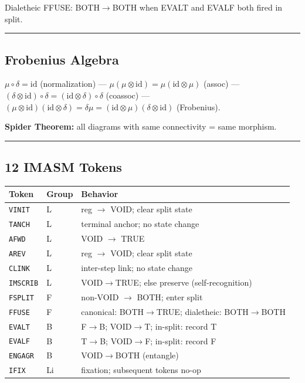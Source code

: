 Dialetheic FFUSE: BOTH\(\to\)BOTH when EVALT and EVALF both fired in
split.

\begin{center}\rule{0.5\linewidth}{0.5pt}\end{center}

\hypertarget{frobenius-algebra}{%
\subsection{Frobenius Algebra}\label{frobenius-algebra}}

\(\mu \circ \delta = \mathrm{id}\) (normalization) ---
\(\mu(\mu\otimes\mathrm{id}) = \mu(\mathrm{id}\otimes\mu)\) (assoc) ---
\((\delta\otimes\mathrm{id})\circ\delta = (\mathrm{id}\otimes\delta)\circ\delta\)
(coassoc) ---
\((\mu\otimes\mathrm{id})(\mathrm{id}\otimes\delta) = \delta\mu = (\mathrm{id}\otimes\mu)(\delta\otimes\mathrm{id})\)
(Frobenius).

\textbf{Spider Theorem:} all diagrams with same connectivity = same
morphism.

\begin{center}\rule{0.5\linewidth}{0.5pt}\end{center}

\hypertarget{imasm-tokens}{%
\subsection{12 IMASM Tokens}\label{imasm-tokens}}

\begin{longtable}[]{@{}lll@{}}
\toprule
Token & Group & Behavior\tabularnewline
\midrule
\endhead
\texttt{VINIT} & L & reg \(\to\) VOID; clear split state\tabularnewline
\texttt{TANCH} & L & terminal anchor; no state change\tabularnewline
\texttt{AFWD} & L & VOID \(\to\) TRUE\tabularnewline
\texttt{AREV} & L & reg \(\to\) VOID; clear split state\tabularnewline
\texttt{CLINK} & L & inter-step link; no state change\tabularnewline
\texttt{IMSCRIB} & L & VOID\(\to\)TRUE; else preserve
(self-recognition)\tabularnewline
\texttt{FSPLIT} & F & non-VOID \(\to\) BOTH; enter split\tabularnewline
\texttt{FFUSE} & F & canonical: BOTH\(\to\)TRUE; dialetheic:
BOTH\(\to\)BOTH\tabularnewline
\texttt{EVALT} & B & F\(\to\)B; VOID\(\to\)T; in-split: record
T\tabularnewline
\texttt{EVALF} & B & T\(\to\)B; VOID\(\to\)F; in-split: record
F\tabularnewline
\texttt{ENGAGR} & B & VOID\(\to\)BOTH (entangle)\tabularnewline
\texttt{IFIX} & Li & fixation; subsequent tokens no-op\tabularnewline
\bottomrule
\end{longtable}

